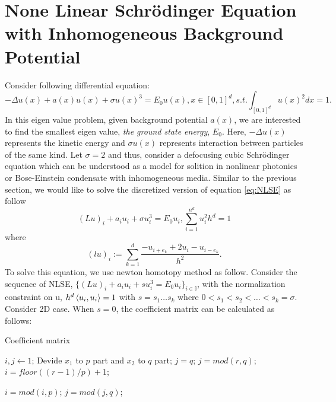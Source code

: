 \section{None Linear Schr\"{o}dinger Equation with Inhomogeneous Background Potential}
Consider following differential equation:
\begin{equation}
-\Delta u(x) + a(x)u(x) + \sigma u(x)^3 = E_0 u(x), x\in [0,1]^d, s.t. \int_{[0,1]^d}u(x)^2 dx = 1.
\label{eq:NLSE}
\end{equation}
In this eigen value problem, given background potential $a(x)$, we are interested to find the smallest eigen value, \textit{the ground state energy}, $E_0$. Here,  $-\Delta u(x)$ represents the kinetic energy and $\sigma u(x)$ represents interaction between particles of the same kind. Let $\sigma = 2$ and thus, consider a defocusing cubic Schr\"{o}dinger equation which can be understood as a model for solition in nonlinear photonics or Bose-Einstein condensate with inhomogeneous media. Similar to the previous section, we would like to solve the discretized version of equation \eqref{eq:NLSE} as follow
\begin{equation}
(Lu)_i + a_i u_i + \sigma u_{i}^3 = E_0 u_i, \sum_{i=1}^{n^d} u_{i}^2 h^d = 1
\end{equation}
where
\begin{equation*}
(lu)_i := \sum_{k=1}^{d} \frac{-u_{i+e_{k}} + 2u_i - u_{i-e_{k}}}{h^2}.
\end{equation*}
To solve this equation, we use newton homotopy method as follow. Consider the sequence of NLSE, $\{ (Lu)_i + a_i u_i + s u_{i}^{3} = E_0 u_i \}_{i \in \mathbb{I}}$, with the normalization constraint on u, $h^d \mathop{\langle u_i, u_i \rangle} = 1$ with $s = s_1\dots s_k$ where $0<s_1<s_2<\dots<s_k=\sigma$. Consider 2D case. When $s = 0$, the coefficient matrix can be calculated as follows:
\begin{algorithm}[H]
	\caption{Coefficient matrix} 
		\label{alg:NLSE_FDM_Matrix}
	\begin{algorithmic}[1]
		\State $i,j \leftarrow 1$;
		\State Devide $x_1$ to $p$ part and $x_2$ to $q$ part; 
		\State $j = q$;
		\Else 
		\State $j = mod(r,q)$;
		\EndIf
		\State $i = floor((r-1)/p)+1$;
		
		\State $i = mod(i,p)$;
		\EndIf
		\State $j = mod(j,q)$;
		\EndIf
	\end{algorithmic}
\end{algorithm} 
